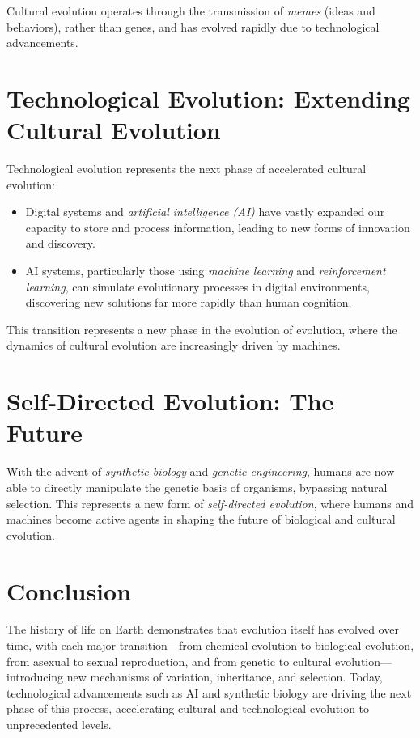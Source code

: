\documentclass[10pt,titlepage]{book}
\begin{document}
Cultural evolution operates through the transmission of \textit{memes} (ideas and behaviors), rather than genes, and has evolved rapidly due to technological advancements.

\section{Technological Evolution: Extending Cultural Evolution}

Technological evolution represents the next phase of accelerated cultural evolution:
\begin{itemize}
    \item Digital systems and \textit{artificial intelligence (AI)} have vastly expanded our capacity to store and process information, leading to new forms of innovation and discovery.
    \item AI systems, particularly those using \textit{machine learning} and \textit{reinforcement learning}, can simulate evolutionary processes in digital environments, discovering new solutions far more rapidly than human cognition.
\end{itemize}

This transition represents a new phase in the evolution of evolution, where the dynamics of cultural evolution are increasingly driven by machines.

\section{Self-Directed Evolution: The Future}

With the advent of \textit{synthetic biology} and \textit{genetic engineering}, humans are now able to directly manipulate the genetic basis of organisms, bypassing natural selection. This represents a new form of \textit{self-directed evolution}, where humans and machines become active agents in shaping the future of biological and cultural evolution.

\section{Conclusion}

The history of life on Earth demonstrates that evolution itself has evolved over time, with each major transition—from chemical evolution to biological evolution, from asexual to sexual reproduction, and from genetic to cultural evolution—introducing new mechanisms of variation, inheritance, and selection. Today, technological advancements such as AI and synthetic biology are driving the next phase of this process, accelerating cultural and technological evolution to unprecedented levels.
\end{document}
